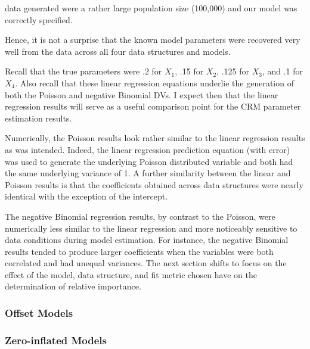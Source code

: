 \documentclass[ShortAfour,times,sageapa]{sagej}
\begin{document}
data generated were a rather large population size (100,000) and our model was correctly specified.  

Hence, it is not a surprise that the known model parameters were recovered very well from the data across all four data structures and models.

Recall that the true parameters were .2 for $X_1$, .15 for $X_2$, .125 for $X_3$, and .1 for $X_4$.  
Also recall that these linear regression equations underlie the generation of both the Poisson and negative Binomial DVs.  
I expect then that the linear regression results will serve as a useful comparison point for the CRM parameter estimation results.



Numerically, the Poisson results look rather similar to the linear regression results as was intended.  
Indeed, the linear regression prediction equation (with error) was used to generate the underlying Poisson distributed variable and both had the same underlying variance of 1.
A further similarity between the linear and Poisson results is that the coefficients obtained across data structures were nearly identical with the exception of the intercept.



The negative Binomial regression results, by contrast to the Poisson, were numerically less similar to the linear regression and more noticeably sensitive to data conditions during model estimation.
For instance, the negative Binomial results tended to produce larger coefficients when the variables were both correlated and had unequal variances.
The next section shifts to focus on the effect of the model, data structure, and fit metric chosen have on the determination of relative importance.

\subsubsection{Offset Models}

\subsubsection{Zero-inflated Models}




	
\end{document}
